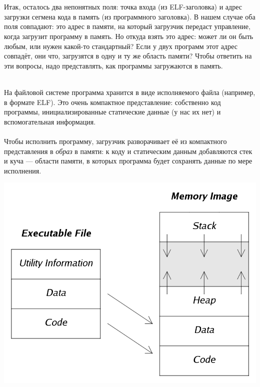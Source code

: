 \documentclass[11pt]{book}
\begin{document}
\\ \\
Итак, осталось два непонятных поля: точка входа (из ELF-заголовка) и адрес загрузки сегмена кода в память (из программного заголовка).
В нашем случае оба поля совпадают: это адрес в памяти, на который загрузчик передаст управление, когда загрузит программу в память.
Но откуда взять это адрес: может ли он быть любым, или нужен какой-то стандартный?
Если у двух программ этот адрес совпадёт, они что, загрузятся в одну и ту же область памяти?
Чтобы ответить на эти вопросы, надо представлять, как программы загружаются в память.
\\ \\
\begin{minipage}{0.5\textwidth}
На файловой системе программа хранится в виде исполняемого файла (например, в формате ELF).
Это очень компактное представление: собственно код программы, инициализированные статические данные (у нас их нет) и вспомогательная информация.
\\ \\
Чтобы исполнить программу, загрузчик разворачивает её из компактного представления в \emph{образ} в памяти:
к коду и статическим данным добавляются стек и куча --- области памяти, в которых программа будет сохранять данные по мере исполнения.
\end{minipage}
\begin{minipage}{0.5\textwidth}
\centering
\includegraphics[width=\textwidth]{pic/executable_image.png}
\end{minipage}
\\ \\
\end{document}
